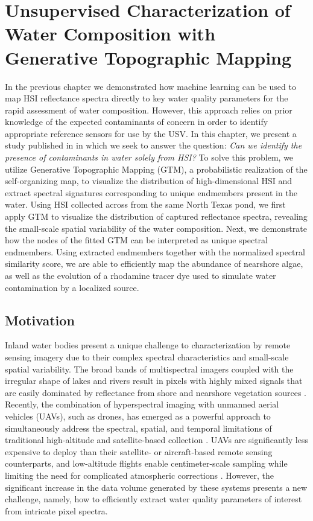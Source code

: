 \chapter{Unsupervised Characterization of Water Composition with Generative Topographic Mapping}\label{ch:robot-team-gtm}


In the previous chapter we demonstrated how machine learning can be used to map
HSI reflectance spectra directly to key water quality parameters for the rapid
assessment of water composition. However, this approach relies on prior
knowledge of the expected contaminants of concern in order to identify
appropriate reference sensors for use by the USV. In this chapter, we present a
study published in \cite{robot-team-gtm} in which we seek to answer the
question: \textit{Can we identify the presence of contaminants in water solely
  from HSI?} To solve this problem, we utilize Generative Topographic Mapping (GTM), a
probabilistic realization of the self-organizing map, to visualize the distribution
of high-dimensional HSI and extract spectral signatures
corresponding to unique endmembers present in the water.  Using HSI collected
across from the same North Texas pond, we first apply  GTM to visualize the
distribution of captured reflectance spectra, revealing the small-scale spatial
variability of the water composition. Next, we demonstrate how the nodes of the
fitted GTM can be interpreted as unique spectral endmembers. Using extracted
endmembers together with the normalized spectral similarity score, we are able to
efficiently map the abundance of nearshore algae, as well as the evolution of
a rhodamine tracer dye used to simulate water contamination by a localized
source.



\section{Motivation}

Inland water bodies present a unique challenge to characterization by remote
sensing imagery due to their complex spectral characteristics and small-scale
spatial variability. The broad bands of multispectral imagers coupled with the
irregular shape of lakes and rivers result in pixels with highly mixed signals
that are easily dominated by reflectance from shore and nearshore vegetation
sources \cite{koponen2002lake, ritchie2003remote}. Recently, the combination of
hyperspectral imaging with unmanned aerial vehicles (UAVs), such as drones, has
emerged as a powerful approach to simultaneously address the spectral, spatial,
and temporal limitations of traditional high-altitude and satellite-based
collection \cite{adao2017hyperspectral,arroyo2019implementation}. UAVs are
significantly less expensive to deploy than their satellite- or aircraft-based
remote sensing counterparts, and low-altitude flights enable centimeter-scale
sampling while limiting the need for complicated atmospheric corrections
\cite{banerjee2020uav}. However, the significant increase in the data volume
generated by these systems presents a new challenge, namely, how to efficiently
extract water quality parameters of interest from intricate pixel spectra.

